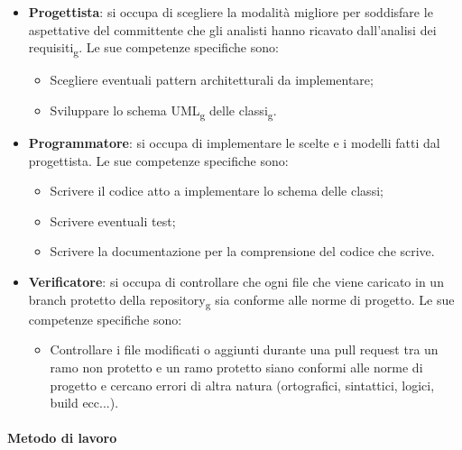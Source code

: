 \begin{itemize}
\item \textbf{Progettista}: si occupa di scegliere la modalità migliore per soddisfare le aspettative del committente che gli analisti hanno ricavato dall'analisi dei requisiti\textsubscript{g}. Le sue competenze specifiche sono:
\begin{itemize}
	\item Scegliere eventuali pattern architetturali da implementare;
	\item Sviluppare lo schema UML\textsubscript{g} delle classi\textsubscript{g}.
\end{itemize}

\item \textbf{Programmatore}: si occupa di implementare le scelte e i modelli fatti dal progettista. Le sue competenze specifiche sono:
\begin{itemize}
	\item Scrivere il codice atto a implementare lo schema delle classi;
	\item Scrivere eventuali test;
	\item Scrivere la documentazione per la comprensione del codice che scrive.
\end{itemize}

\item \textbf{Verificatore}: si occupa di controllare che ogni file che viene caricato in un branch protetto della repository\textsubscript{g} sia conforme alle norme di progetto. Le sue competenze specifiche sono:
\begin{itemize}
	\item Controllare i file modificati o aggiunti durante una pull request tra un ramo non protetto e un ramo protetto siano conformi alle norme di progetto e cercano errori di altra natura (ortografici, sintattici, logici, build ecc...).
\end{itemize}

\end{itemize}

\paragraph{Metodo di lavoro}